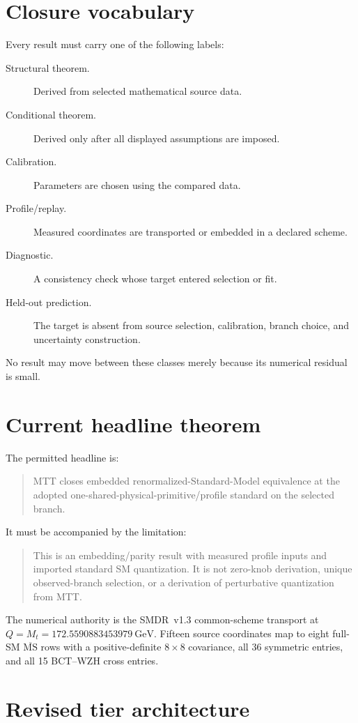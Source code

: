 \documentclass[11pt]{article}
\begin{document}
\section{Closure vocabulary}

Every result must carry one of the following labels:
\begin{description}
\item[Structural theorem.] Derived from selected mathematical source data.
\item[Conditional theorem.] Derived only after all displayed assumptions are
imposed.
\item[Calibration.] Parameters are chosen using the compared data.
\item[Profile/replay.] Measured coordinates are transported or embedded in a
declared scheme.
\item[Diagnostic.] A consistency check whose target entered selection or fit.
\item[Held-out prediction.] The target is absent from source selection,
calibration, branch choice, and uncertainty construction.
\end{description}
No result may move between these classes merely because its numerical residual
is small.

\section{Current headline theorem}

The permitted headline is:
\begin{quote}
MTT closes embedded renormalized-Standard-Model equivalence at the adopted
one-shared-physical-primitive/profile standard on the selected branch.
\end{quote}
It must be accompanied by the limitation:
\begin{quote}
This is an embedding/parity result with measured profile inputs and imported
standard SM quantization. It is not zero-knob derivation, unique observed-branch
selection, or a derivation of perturbative quantization from MTT.
\end{quote}

The numerical authority is the SMDR~v1.3 common-scheme transport at
$Q=M_t=172.5590883453979~\mathrm{GeV}$. Fifteen source coordinates map to eight
full-SM $\overline{\mathrm{MS}}$ rows with a positive-definite $8\times8$
covariance, all 36 symmetric entries, and all 15 BCT--WZH cross entries.

\section{Revised tier architecture}
\end{document}
